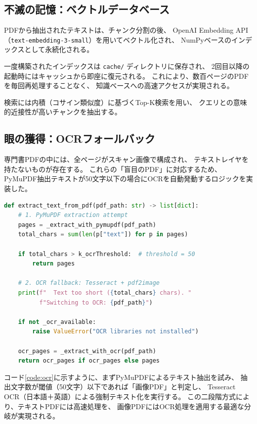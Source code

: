 \documentclass[uplatex, dvipdfmx, a4paper, 11pt]{jsarticle}
\begin{document}
\subsection{不滅の記憶：ベクトルデータベース}
PDFから抽出されたテキストは、チャンク分割の後、
OpenAI Embedding API（\texttt{text-embedding-3-small}）を用いてベクトル化され、
NumPyベースのインデックスとして永続化される。

一度構築されたインデックスは \texttt{cache/} ディレクトリに保存され、
2回目以降の起動時にはキャッシュから即座に復元される。
これにより、数百ページのPDFを毎回再処理することなく、
知識ベースへの高速アクセスが実現される。

検索には内積（コサイン類似度）に基づくTop-K検索を用い、
クエリとの意味的近接性が高いチャンクを抽出する。

\subsection{眼の獲得：OCRフォールバック}
専門書PDFの中には、全ページがスキャン画像で構成され、
テキストレイヤを持たないものが存在する。
これらの「盲目のPDF」に対応するため、
PyMuPDF抽出テキストが50文字以下の場合にOCRを自動発動するロジックを実装した。

\begin{lstlisting}[language=Python, caption=OCR Fallback Logic (src/pdf\_reader.py), label=code:ocr]
def extract_text_from_pdf(pdf_path: str) -> list[dict]:
    # 1. PyMuPDF extraction attempt
    pages = _extract_with_pymupdf(pdf_path)
    total_chars = sum(len(p["text"]) for p in pages)

    if total_chars > k_ocrThreshold:  # threshold = 50
        return pages

    # 2. OCR fallback: Tesseract + pdf2image
    print(f"  Text too short ({total_chars} chars). "
          f"Switching to OCR: {pdf_path}")

    if not _ocr_available:
        raise ValueError("OCR libraries not installed")

    ocr_pages = _extract_with_ocr(pdf_path)
    return ocr_pages if ocr_pages else pages
\end{lstlisting}

コード\ref{code:ocr}に示すように、まずPyMuPDFによるテキスト抽出を試み、
抽出文字数が閾値（50文字）以下であれば「画像PDF」と判定し、
Tesseract OCR（日本語＋英語）による強制テキスト化を実行する。
この二段階方式により、テキストPDFには高速処理を、
画像PDFにはOCR処理を適用する最適な分岐が実現される。
\end{document}
